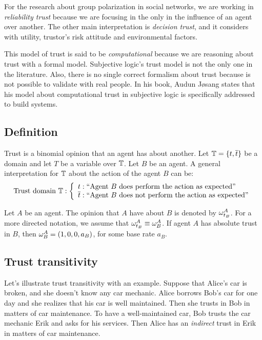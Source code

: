 \documentclass[a4paper,12pt]{article}
\theoremstyle{definition}
\numberwithin{equation}{section}
\newcommand{\qm}[1]{`#1'}
\begin{document}
For the research about group polarization in social networks, we are working in \emph{reliability trust} because we are focusing in the only in the influence of an agent over another. The other main interpretation is \emph{decision trust}, and it considers with utility, trustor's risk attitude and environmental factors.

This model of trust is said to be \emph{computational} because we are reasoning about trust with a formal model. Subjective logic's trust model is not the only one in the literature. Also, there is no single correct formalism about trust because is not possible to validate with real people. In his book, Audun Jøsang states that his model about computational trust in subjective logic is specifically addressed to build systems.

\subsection{Definition}

Trust is a binomial opinion that an agent has about another. Let $\mathbb{T} = \{t, \overline{t}\}$ be a domain and let $T$ be a variable over $\mathbb{T}$. Let $B$ be an agent. A general interpretation for $\mathbb{T}$ about the action of the agent $B$ can be:
\begin{equation}
	\text{Trust domain } \dom{T}: \left\{
	\begin{array}{l}
	t: \text{\qm{\qm{Agent $B$ does perform the action as expected}}}\\
	\overline{t}: \text{\qm{\qm{Agent $B$ does not perform the action as expected}}}
	\end{array}
	\right.
\end{equation}

Let $A$ be an agent. The opinion that $A$ have about $B$ is denoted by $\omega^{A}_{t_B}$. For a more directed notation, we assume that $\omega^{A}_{t_B} \equiv \omega^{A}_{B}$. If agent $A$ has absolute trust in $B$, then $\omega^{A}_{B} = (1, 0, 0, a_B)$, for some base rate $a_B$.

\subsection{Trust transitivity}

Let's illustrate trust transitivity with an example. Suppose that Alice's car is broken, and she doesn't know any car mechanic. Alice borrows Bob's car for one day and she realizes that his car is well maintained. Then she trusts in Bob in matters of car maintenance. To have a well-maintained car, Bob trusts the car mechanic Erik and asks for his services. Then Alice has an \emph{indirect} trust in Erik in matters of car maintenance.
\end{document}
